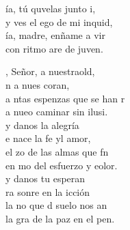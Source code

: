 \begin{cancion}%
	\begin{chorus}%
	ía, tú quvelas junto i,\\
	y ves el ego de mi inquid,\\
	ía, madre, enñame a vir \\
	con ritmo are de juven.\\
	\end{chorus}%
	, Señor, a nuestraold,\\
	n a nues coran,\\
	a ntas espenzas que se han r\\
	a nueo caminar sin ilusi.\\
	 y danos la alegría \\
	e nace la fe yl amor,\\
	el zo de las almas que fn\\
	en mo del esfuerzo y eolor.\\
	 y danos tu esperan  \\
	ra sonre en la icción\\
	la no que d suelo nos an\\
	la gra de la paz en el pen. \\
\end{cancion}%
